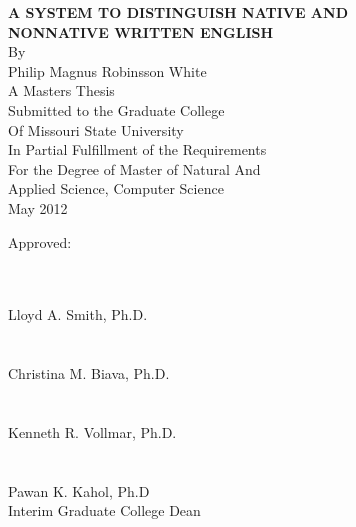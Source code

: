 \documentclass[main.tex]{subfiles}
\begin{document}
\centering

\textbf{A SYSTEM TO DISTINGUISH NATIVE AND\\NONNATIVE WRITTEN ENGLISH}\\
By\\
Philip Magnus Robinsson White\\
\null\null
\singlespacing
A Masters Thesis\\
Submitted to the Graduate College\\
Of Missouri State University\\
In Partial Fulfillment of the Requirements\\
For the Degree of Master of Natural And\\Applied Science, Computer Science\\
\null
May 2012\\
\null\null\null\null\null\null\null\null\null\null
\raggedleft
\begin{minipage}[t]{3.5in}
Approved:\\\\
\begin{flushright}
\begin{minipage}[b]{3.2in}
\makebox[3.2in]{\hrulefill}\\
Lloyd A. Smith, Ph.D.\\\\
\makebox[3.2in]{\hrulefill}\\
Christina M. Biava, Ph.D.\\\\
\makebox[3.2in]{\hrulefill}\\
Kenneth R. Vollmar, Ph.D.\\\\
\makebox[3.2in]{\hrulefill}\\
Pawan K. Kahol, Ph.D\\Interim Graduate College Dean\\
\end{minipage}
\end{flushright}
\end{minipage}
\end{document}
